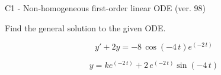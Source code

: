 \begin{exercise}
  \begin{exerciseTitle}C1 - Non-homogeneous first-order linear ODE (ver. 98)\end{exerciseTitle}
  \begin{exerciseStatement}
    
Find the general solution to the given ODE.

    
\[y'+2y= -8 \, \cos\left(-4 \, t\right) e^{\left(-2 \, t\right)}\]

  \end{exerciseStatement}
  \begin{exerciseAnswer}
    
\[y= k e^{\left(-2 \, t\right)} + 2 \, e^{\left(-2 \, t\right)} \sin\left(-4 \, t\right)\]

  \end{exerciseAnswer}
\end{exercise}
